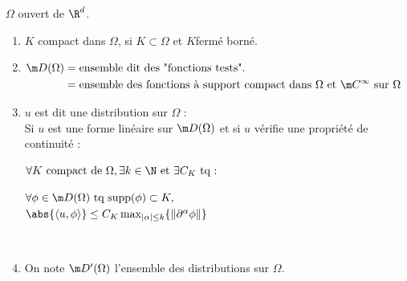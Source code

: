 \documentclass[12pt,a4paper]{article}
\begin{document}
	\begin{defi}
		$\Omega$ ouvert de $\R^d$.
		\begin{enumerate}
			\item[$\star$] $K$ compact dans $\Omega$, si $K \subset \Omega$ et $K$fermé borné.
			\item[$\star$] $\begin{aligned}[t]
				\m D(\Omega)
				&= \text{ensemble dit des "fonctions tests".}\\
				&= \text{ensemble des fonctions à support compact dans } \Omega \text{ et }
 \m C^\infty \text{ sur } \Omega
 			\end{aligned}$
			\item[$\star$] $u$ est dit une distribution sur $\Omega$ :\\
			Si $u$ est une forme linéaire sur $\m D (\Omega)$ et si $u$ vérifie une propriété de continuité :
			
			\begin{minipage}{7.5cm}
				
			$\forall K \text{ compact de } \Omega, \exists k \in \N \text{ et } \exists C_K \text{ tq : }$
			\begin{center}
			$\forall\phi\in \m D(\Omega) \text{ tq } \text{supp}(\phi) \subset K,$\\ $\abs{\left<u,\phi\right>} \leq C_K \max_{|\alpha| \leq k}\{\|\partial^\alpha\phi\|\}$
			\end{center}
			
			\end{minipage}\begin{minipage}{6.7cm}
			$ $ \hspace*{2cm}
			\end{minipage}
			
			\item[$\star$] On note $\m D'(\Omega)$ l'ensemble des distributions sur $\Omega$.
		\end{enumerate}
	\end{defi}
	
\end{document}

